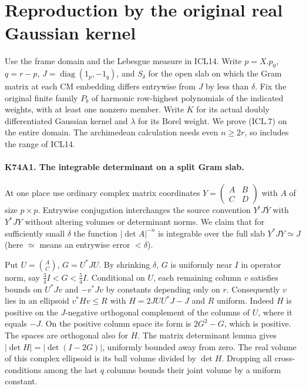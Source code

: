 \section{Reproduction by the original real Gaussian kernel}

Use the frame domain and the Lebesgue measure in ICL14. Write
$p=X.p_0$, $q=r-p$, $J=\operatorname{diag}(1_p,-1_q)$, and
$S_\delta$ for the open slab on which the Gram matrix at each CM
embedding differs entrywise from $J$ by less than $\delta$. Fix the
original finite family $P_b$ of harmonic row-highest polynomials of
the indicated weights, with at least one nonzero member. Write $K$ for
its actual doubly differentiated Gaussian kernel and $\lambda$ for
its Borel weight. We prove (ICL.7) on the entire domain. The
archimedean calculation needs even $n\ge 2r$, so includes the range
of ICL14.

\paragraph{K74A1. The integrable determinant on a split Gram slab.}
At one place use ordinary complex matrix coordinates
$Y=\left(\begin{smallmatrix}A&B\\C&D\end{smallmatrix}\right)$
with $A$ of size $p\times p$. Entrywise conjugation interchanges the
source convention $Y^tJ\bar Y$ with $Y^*JY$ without altering volumes
or determinant norms. We claim that for sufficiently small $\delta$
the function $|\det A|^{-n}$ is integrable over the full slab
$Y^*JY\simeq J$ (here $\simeq$ means an entrywise error $<\delta$).

Put $U=\binom AC$, $G=U^*JU$. By shrinking $\delta$,
$G$ is uniformly near $I$ in operator norm, say
$\frac34 I<G<\frac54 I$. Conditional on $U$, each remaining column
$v$ satisfies bounds on $U^*Jv$ and $-v^*Jv$ by constants depending
only on $r$. Consequently $v$ lies in an ellipsoid
$v^*Hv\le R$ with $H=2JU U^*J-J$ and $R$ uniform. Indeed $H$ is
positive on the $J$-negative orthogonal complement of the columns
of $U$, where it equals $-J$. On the positive column space its
form is $2G^2-G$, which is positive. The spaces are orthogonal also
for $H$. The matrix determinant lemma gives
$|\det H|=|\det(I-2G)|$, uniformly bounded away from zero.
The real volume of this complex ellipsoid is its ball volume
divided by $\det H$. Dropping all cross-conditions among the last
$q$ columns bounds their joint volume by a uniform constant.

